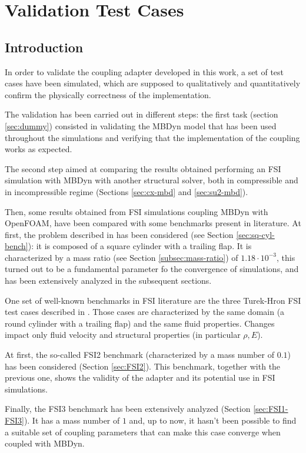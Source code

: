 \chapter{Validation Test Cases}
\label{cha:tests}


\section{Introduction}

In order to validate the coupling adapter developed in this work, a set of test cases have been simulated, which are supposed to qualitatively and quantitatively confirm the physically correctness of the implementation.

The validation has been carried out in different steps: the first task (section \ref{sec:dummy}) consisted in validating the MBDyn model that has been used throughout the simulations and verifying that the implementation of the coupling works as expected.

The second step aimed at comparing the results obtained performing an FSI simulation with MBDyn with another structural solver, both in compressible and in incompressible regime (Sections \ref{sec:cx-mbd} and \ref{sec:su2-mbd}).

Then, some results obtained from FSI simulations coupling MBDyn with OpenFOAM, have been compared with some benchmarks present in literature. At first, the problem described in \cite{ramm1998fluid} has been considered (see Section \ref{sec:sq-cyl-bench}): it is composed of a square cylinder with a trailing flap. It is characterized by a mass ratio (see Section \ref{subsec:mass-ratio}) of $1.18\cdot 10^{-3}$, this turned out to be a fundamental parameter fo the convergence of simulations, and has been extensively analyzed in the subsequent sections.

One set of well-known benchmarks in FSI literature are the three Turek-Hron FSI test cases described in \cite{turek2006proposal}. Those cases are characterized by the same domain (a round cylinder with a trailing flap) and the same fluid properties. Changes impact only fluid velocity and structural properties (in particular $\rho,E$).

At first, the so-called FSI2 benchmark (characterized by a mass number of $0.1$) has been considered (Section \ref{sec:FSI2}). This benchmark, together with the previous one, shows the validity of the adapter and its potential use in FSI simulations.

Finally, the FSI3 benchmark has been extensively analyzed (Section \ref{sec:FSI1-FSI3}). It has a mass number of $1$ and, up to now, it hasn't been possible to find a suitable set of coupling parameters that can make this case converge when coupled with MBDyn.

